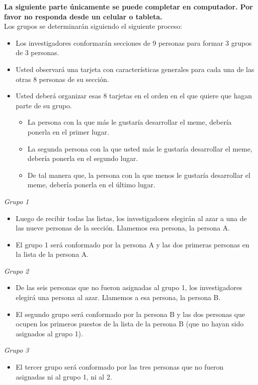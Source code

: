 \noindent\textbf{\Large{La siguiente parte únicamente se puede completar en computador. Por favor no responda desde un celular o tableta.}}\\
Los grupos se determinarán siguiendo el siguiente proceso:
\begin{itemize}
    \item Los investigadores conformarán secciones de 9 personas para formar 3 grupos de 3 personas.
    \item Usted observará una tarjeta con características generales para cada una de las otras 8 personas de su sección.
    \item Usted deberá organizar esas 8 tarjetas en el orden en el que quiere que hagan parte de su grupo.
    \begin{itemize}
        \item La persona con la que más le gustaría desarrollar el meme, debería ponerla en el primer lugar.
        \item La segunda persona con la que usted más le gustaría desarrollar el meme, debería ponerla en el segundo lugar.
        \item De tal manera que, la persona con la que menos le gustaría desarrollar el meme, debería ponerla en el último lugar.
    \end{itemize}
\end{itemize}
\textit{Grupo 1}
\begin{itemize}
    \item Luego de recibir todas las listas, los investigadores elegirán al azar a una de las nueve personas de la sección. Llamemos esa persona, la persona A.
    \item El grupo 1 será conformado por la persona A y las dos primeras personas en la lista de la persona A.
\end{itemize}
\textit{Grupo 2}
\begin{itemize}
    \item De las seis personas que no fueron asignadas al grupo 1, los investigadores elegirá una persona al azar. Llamemos a esa persona, la persona B.
    \item El segundo grupo será conformado por la persona B y las dos personas que ocupen los primeros puestos de la lista de la persona B (que no hayan sido asignados al grupo 1).
\end{itemize}
\textit{Grupo 3}
\begin{itemize}
    \item El tercer grupo será conformado por las tres personas que no fueron asignadas ni al grupo 1, ni al 2.
\end{itemize}
